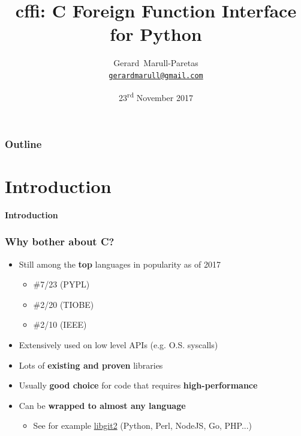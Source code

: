 \documentclass[handout]{beamer}
\title{cffi: C Foreign Function Interface for Python}
\author{Gerard~Marull-Paretas\\
        \href{mailto:gerardmarull@gmail.com}{\texttt{gerardmarull@gmail.com}}}
\date{23\textsuperscript{rd} November 2017}
\begin{document}
\begin{frame}
  \thispagestyle{empty}
  \titlepage{}
\end{frame}

\begin{frame}
  \frametitle{Outline}
  \tableofcontents
\end{frame}

\section{Introduction}

\begin{frame}[plain]{}
  \begin{center}
    \Huge \textbf{Introduction}
  \end{center}
\end{frame}

\begin{frame}
  \frametitle{Why bother about C?}

  \begin{itemize}
    \item<1-> Still among the \textbf{top} languages in popularity as of 2017
      \begin{itemize}
        \item \#7/23 (PYPL)
        \item \#2/20 (TIOBE)
        \item \#2/10 (IEEE)
      \end{itemize}
    \item<2-> Extensively used on low level APIs (e.g. O.S. syscalls)
    \item<3-> Lots of \textbf{existing and proven} libraries
    \item<4-> Usually \textbf{good choice} for code that requires
      \textbf{high-performance}
    \item<5-> Can be \textbf{wrapped to almost any language}
      \begin{itemize}
        \item See for example \href{https://libgit2.github.com/}{libgit2}
          (Python, Perl, NodeJS, Go, PHP...)
      \end{itemize}
  \end{itemize}
\end{frame}
\end{document}

